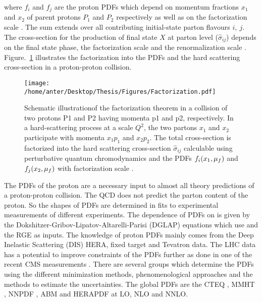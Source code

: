 where $f_i$ and $f_{j}$ are the proton PDFs which depend on momentum fractions $x_1$ and $x_2$ of parent protons $P_1$ and $P_2$ respectively as well as on the factorization scale \muf. The sum extends over all contributing initial-state parton flavours $i,~j$. The cross-section for the production of final state $X$ at parton level ($\hat\sigma_{ij}$) depends on the final state phase, the factorization scale \muf and the renormalization scale \mur. Figure.~\ref{fig:fac} illustrates the factorization into the PDFs and the hard scattering cross-section in a proton-proton collision.
\begin{figure}[!h]
\begin{center}
\hspace*{-7mm}
\texttt{[image: /home/anter/Desktop/Thesis/Figures/Factorization.pdf]}\\
\vspace*{4mm}
\caption[Schematic illustration of the factorization theorem in a collision of two protons.]{Schematic illustration\footnotemark of the factorization theorem in a collision of two protons P1 and P2 having momenta p1 and p2, respectively. In a hard-scattering process at a scale $Q^2$, the two partons $x_1$ and $x_2$ participate with momenta $x_1p_1$ and $x_2p_2$. The total cross-section is factorized into the hard scattering cross-section $\hat\sigma_{ij}$ calculable using perturbative quantum chromodynamics and the PDFs $f_i(x_1,\mu_f)$ and $f_j(x_2,\mu_f)$ with factorization scale \muf.}
\label{fig:fac}
\end{center}
\end{figure}
The PDFs of the proton are a necessary input to almost all theory predictions of a proton-proton collision. The QCD does not predict the parton content of the proton. So the shapes of PDFs are determined in fits to experimental measurements of different experiments. The dependence of PDFs on \muf is given by the Dokshitzer-Gribov-Lipatov-Altarelli-Parisi (DGLAP) \cite{Gribov:1972ri,Dokshitzer:1977sg,Altarelli:1977zs} equations which use \alps and the RGE as inputs. The knowledge of proton PDFs mainly comes from the Deep Inelastic Scattering (DIS) HERA, fixed target and Tevatron data. The LHC data has a potential to improve constraints of the PDFs further as done in one of the recent CMS measurements \cite{Sirunyan:2017skj}. There are several groups which determine the PDFs using the different minimization methods, phenomenological approaches and the methods to estimate the uncertainties. The global PDFs are the CTEQ \cite{Dulat:2015mca}, MMHT \cite{Harland-Lang:2014zoa}, NNPDF \cite{Ball:2014uwa}, ABM \cite{Alekhin:2012ig} and HERAPDF \cite{Abramowicz:2015mha} at LO, NLO and NNLO.

